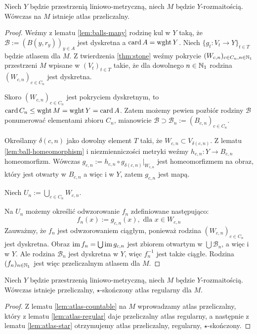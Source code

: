 \begin{lem} \label{lem:atlas-countable}
  Niech $Y$ będzie przestrzenią liniowo-metryczną, niech $M$ będzie $Y$-rozmaitością. Wówczas na $M$ istnieje atlas przeliczalny.
  \begin{proof}
    Weźmy z lematu \ref{lem:balls-many} rodzinę kul w $Y$ taką, że $\mathcal B := (B(y,r_y))_{y\in A}$ jest dyskretna a $\operatorname{card} A = \operatorname{wght} Y$.
    Niech $\{g_t: V_t \to Y\}_{t \in T}$ będzie atlasem dla $M$.
    Z twierdzenia \ref{thm:stone} weźmy pokrycie $(W_{c,n})_{c \in C_n, n \in \mathbb{N}_1}$ przestrzeni $M$ wpisane w $(V_t)_{t \in T}$ takie, że dla dowolnego $n \in \mathbb{N}_1$ rodzina $(W_{c,n})_{c \in C_n}$ jest dyskretna.
    
    Skoro $(W_{c,n})_{c \in C_n}$ jest pokryciem dyskretnym, to $\operatorname{card} C_n \leq \operatorname{wght} M = \operatorname{wght} Y = \operatorname{card} A$.
    Zatem możemy pewien pozbiór rodziny $\mathcal B$ ponumerować elementami zbioru $C_n$, mianowicie $\mathcal B \supset \mathcal B_n := (B_{c,n})_{c \in C_n}$.
    
    Określamy $\delta(c,n)$ jako dowolny element $T$ taki, że $W_{c,n} \subset V_{\delta(c,n)}$. Z lematu \ref{lem:ball-homeomorphism} i niezmienniczości metryki weźmy $h_{c,n}: Y \to B_{c,n}$ homeomorfizm. Wówczas $g_{c,n} := h_{c,n} \circ g_{\delta(c,n)}|_{W_{c,n}}$ jest homeomorfizmem na obraz, który jest otwarty w $B_{c,n}$ a więc i w $Y$, zatem $g_{c,n}$ jest mapą.
    
    Niech $U_n := \bigcup_{c \in C_n} W_{c,n}$.
    
    Na $U_n$ możemy określić odwzorowanie $f_n$ zdefiniowane następująco:
    \[
      f_n(x) := g_{c,n}(x),\mbox{ dla }x\in W_{c,n}
    \]
    Zauważmy, że $f_n$ jest odwzorowaniem ciągłym, ponieważ rodzina $(W_{c,n})_{c \in C_n}$ jest dyskretna. Obraz $\operatorname{im} f_n = \bigcup \operatorname{im} g_{c,n}$ jest zbiorem otwartym w $\bigcup \mathcal B_n$, a więc i w $Y$. Ale rodzina $\mathcal B_n$ jest dyskretna w $Y$, więc $f_n^{-1}$ jest także ciągłe.
    Rodzina $(f_n)_{n \in \mathbb{N}_1}$ jest więc przeliczalnym atlasem dla $M$.
  \end{proof}
\end{lem}

\begin{thm}
  Niech $Y$ będzie przestrzenią liniowo-metryczną, niech $M$ będzie $Y$-rozmaitością. Wówczas istnieje przeliczalny, $\star$-skończony atlas regularny dla $M$.
  \begin{proof}
    Z lematu \ref{lem:atlas-countable} na $M$ wprowadzamy atlas przeliczalny, który z lematu \ref{lem:atlas-regular} daje przeliczalny atlas regularny, a następnie z lematu \ref{lem:atlas-star} otrzymujemy atlas przeliczalny, regularny, $\star$-skończony.
  \end{proof}
\end{thm}